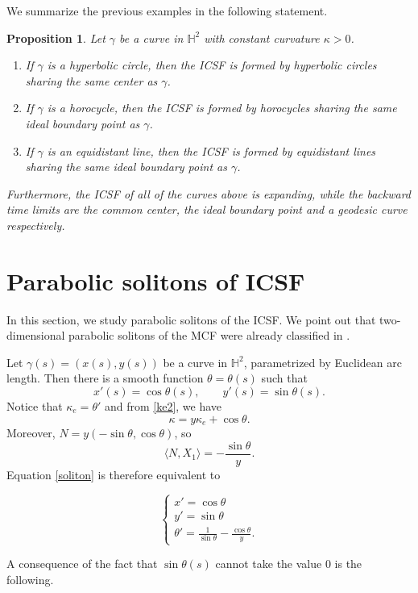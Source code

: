 \documentclass[12pt]{amsart}
\theoremstyle{plain}
\newtheorem{proposition}[theorem]{Proposition}
\theoremstyle{definition}
\def\h{\mathbb H}
\begin{document}
We summarize the previous examples in the following statement. 

\begin{proposition}
Let $\gamma$ be a curve in $\h^2$ with constant curvature $\kappa>0$.  
\begin{enumerate}
\item If $\gamma$ is a hyperbolic circle, then the ICSF is formed by hyperbolic circles sharing the same center as $\gamma$.   
\item If $\gamma$ is a horocycle, then the ICSF is formed by horocycles sharing the same ideal boundary point as $\gamma$. 
\item If $\gamma$ is an equidistant line, then the ICSF is formed by equidistant lines sharing the same ideal boundary point as $\gamma$. 
\end{enumerate}
Furthermore, the ICSF of all of the curves above is expanding, while the backward time limits are the common center, the ideal boundary point and a geodesic curve respectively.
\end{proposition}

  
 \section{Parabolic solitons of ICSF}\label{sec5}

In this section, we study parabolic solitons of the ICSF. We point out that two-dimensional parabolic solitons of the MCF  were already classified in \cite{bl1}. 

Let $\gamma(s)=(x(s),y(s))$ be a curve in $\h^2$, parametrized by Euclidean arc length. Then there is a smooth function $\theta=\theta(s)$ such that 
$$x'(s)=\cos\theta(s),\qquad y'(s)=\sin\theta(s).$$
Notice that $\kappa_e=\theta'$ and from \eqref{ke2}, we have 
$$\kappa=y\kappa_e+\cos\theta.$$
Moreover, $N=y(-\sin\theta,\cos\theta)$, so 
$$\langle N,X_1\rangle=-\frac{\sin\theta}{y}.$$
Equation \eqref{soliton} is therefore equivalent to

\begin{equation}
\label{para1}
\begin{cases}
x' = \cos\theta \\
y' = \sin\theta \\
\displaystyle \theta' =  \frac{1}{\sin\theta} - \frac{\cos\theta}{y}.
\end{cases}
\end{equation}

A consequence of the fact that $\sin\theta(s)$ cannot take the value $0$ is the following.
\end{document}
